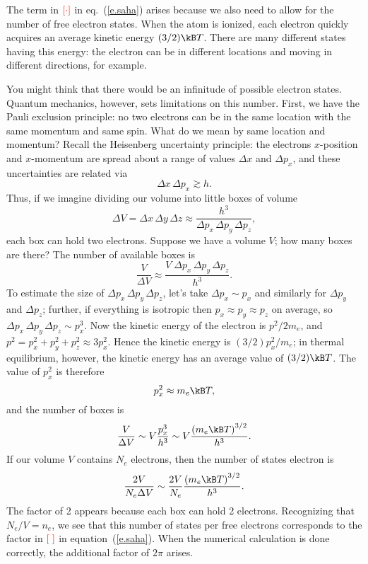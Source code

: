 The term in $\color{red}\left[\cdot\right]$ in eq.~(\ref{e.saha}) arises because we also need to allow for the number of free electron states. When the atom is ionized, each electron quickly acquires an average kinetic energy $(3/2)\kB T$. There are many different states having this energy: the electron can be in different locations and moving in different directions, for example.  

You might think that there would be an infinitude of possible electron states.  Quantum mechanics, however, sets limitations on this number. First, we have the Pauli exclusion principle: no two electrons can be in the same location with the same momentum and same spin. What do we mean by same location and momentum?  Recall the Heisenberg uncertainty principle: the electrons $x$-position and $x$-momentum are spread about a range of values $\Delta x$ and $\Delta p_{x}$, and these uncertainties are related via
\[ \Delta x\,\Delta p_{x} \gtrsim h. \]
Thus, if we imagine dividing our volume into little boxes of volume
\[ 
 \Delta V = \Delta x\,\Delta y\,\Delta z \approx \frac{h^{3}}{\Delta p_{x}\,\Delta p_{y}\,\Delta p_{z}},
\]
each box can hold two electrons. Suppose we have a volume $V$; how many boxes are there?  The number of available boxes is
\[
	\frac{V}{\Delta V} \approx \frac{V\;\Delta p_{x}\,\Delta p_{y}\,\Delta p_{z}}{h^{3}}.
\]
To estimate the size of $\Delta p_{x}\,\Delta p_{y}\,\Delta p_{z}$, let's take $\Delta p_{x}\sim p_{x}$ and similarly for $\Delta p_{y}$ and $\Delta p_{z}$; further, if everything is isotropic then $p_{x}\approx p_{y}\approx p_{z}$ on average, so $\Delta p_{x}\,\Delta p_{y}\,\Delta p_{z} \sim p_{x}^{3}$.  Now the kinetic energy of the electron is $p^{2}/2m_{e}$, and $p^{2} = p_{x}^{2} + p_{y}^{2} + p_{z}^{2} \approx 3 p_{x}^{2}$. Hence the kinetic energy is $(3/2)p_{x}^{2}/m_{e}$; in thermal equilibrium, however, the kinetic energy has an average value of $(3/2)\kB T$.  The value of $p_{x}^{2}$ is therefore
\[
	p_{x}^{2} \approx m_{e}\kB T,
\]
and the number of boxes is
\[
	\frac{V}{\Delta V} \sim V\frac{p_{x}^{3}}{h^{3}} \sim V\frac{\left(m_{e}\kB T\right)^{3/2}}{h^{3}}.
\]
If our volume $V$ contains $N_{e}$ electrons, then the number of states electron is
\[
	\frac{2V}{N_{e}\Delta V} \sim \frac{2V}{N_{e}}\frac{\left(m_{e}\kB T\right)^{3/2}}{h^{3}}.
\]
The factor of 2 appears because each box can hold 2 electrons.  Recognizing that $N_{e}/V = n_{e}$, we see that this number of states per free electrons corresponds to the factor in $\color{red}\left[\;\right]$ in equation~(\ref{e.saha}). When the numerical calculation is done correctly, the additional factor of $2\pi$ arises.

